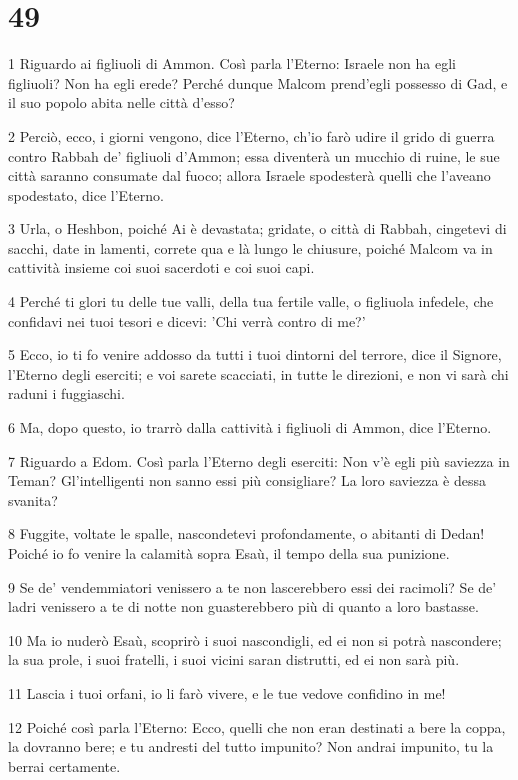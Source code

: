 \chapter{49}

\par 1 Riguardo ai figliuoli di Ammon. Così parla l'Eterno: Israele non ha egli figliuoli? Non ha egli erede? Perché dunque Malcom prend'egli possesso di Gad, e il suo popolo abita nelle città d'esso?
\par 2 Perciò, ecco, i giorni vengono, dice l'Eterno, ch'io farò udire il grido di guerra contro Rabbah de' figliuoli d'Ammon; essa diventerà un mucchio di ruine, le sue città saranno consumate dal fuoco; allora Israele spodesterà quelli che l'aveano spodestato, dice l'Eterno.
\par 3 Urla, o Heshbon, poiché Ai è devastata; gridate, o città di Rabbah, cingetevi di sacchi, date in lamenti, correte qua e là lungo le chiusure, poiché Malcom va in cattività insieme coi suoi sacerdoti e coi suoi capi.
\par 4 Perché ti glori tu delle tue valli, della tua fertile valle, o figliuola infedele, che confidavi nei tuoi tesori e dicevi: 'Chi verrà contro di me?'
\par 5 Ecco, io ti fo venire addosso da tutti i tuoi dintorni del terrore, dice il Signore, l'Eterno degli eserciti; e voi sarete scacciati, in tutte le direzioni, e non vi sarà chi raduni i fuggiaschi.
\par 6 Ma, dopo questo, io trarrò dalla cattività i figliuoli di Ammon, dice l'Eterno.
\par 7 Riguardo a Edom. Così parla l'Eterno degli eserciti: Non v'è egli più saviezza in Teman? Gl'intelligenti non sanno essi più consigliare? La loro saviezza è dessa svanita?
\par 8 Fuggite, voltate le spalle, nascondetevi profondamente, o abitanti di Dedan! Poiché io fo venire la calamità sopra Esaù, il tempo della sua punizione.
\par 9 Se de' vendemmiatori venissero a te non lascerebbero essi dei racimoli? Se de' ladri venissero a te di notte non guasterebbero più di quanto a loro bastasse.
\par 10 Ma io nuderò Esaù, scoprirò i suoi nascondigli, ed ei non si potrà nascondere; la sua prole, i suoi fratelli, i suoi vicini saran distrutti, ed ei non sarà più.
\par 11 Lascia i tuoi orfani, io li farò vivere, e le tue vedove confidino in me!
\par 12 Poiché così parla l'Eterno: Ecco, quelli che non eran destinati a bere la coppa, la dovranno bere; e tu andresti del tutto impunito? Non andrai impunito, tu la berrai certamente.
